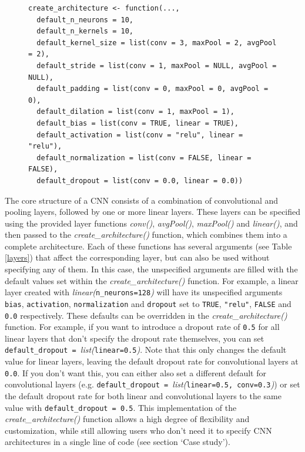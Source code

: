 \documentclass[12pt,twoside]{scrreport}
\newcommand{\pkg}[1]{`#1'}
\newcommand{\fn}[2][]{\textit{#2(}#1\textit{)}}
\newcommand{\val}[1]{\texttt{#1}}
\begin{document}
\begin{figure}[h]
	\centering
	\newsavebox{\lstbox} %
	\begin{lrbox}{\lstbox}
		\begin{lstlisting}
create_architecture <- function(...,
  default_n_neurons = 10,
  default_n_kernels = 10,
  default_kernel_size = list(conv = 3, maxPool = 2, avgPool = 2),
  default_stride = list(conv = 1, maxPool = NULL, avgPool = NULL),
  default_padding = list(conv = 0, maxPool = 0, avgPool = 0),
  default_dilation = list(conv = 1, maxPool = 1),
  default_bias = list(conv = TRUE, linear = TRUE),
  default_activation = list(conv = "relu", linear = "relu"),
  default_normalization = list(conv = FALSE, linear = FALSE),
  default_dropout = list(conv = 0.0, linear = 0.0))
		\end{lstlisting}
	\end{lrbox}
	\resizebox{\textwidth}{!}{\usebox{\lstbox}}
\end{figure}

The core structure of a CNN consists of a combination of convolutional and pooling layers, followed by one or more linear layers. These layers can be specified using the provided layer functions \fn{conv}, \fn{avgPool}, \fn{maxPool} and \fn{linear}, and then passed to the \fn{create\_architecture} function, which combines them into a complete architecture. Each of these functions has several arguments (see Table \ref{layers}) that affect the corresponding layer, but can also be used without specifying any of them. In this case, the unspecified arguments are filled with the default values set within the \fn{create\_architecture} function. For example, a linear layer created with \fn[\val{n\_neurons=128}]{linear} will have its unspecified arguments \val{bias}, \val{activation}, \val{normalization} and \val{dropout} set to \val{TRUE}, \val{"relu"}, \val{FALSE} and \val{0.0} respectively. These defaults can be overridden in the \fn{create\_architecture} function. For example, if you want to introduce a dropout rate of \val{0.5} for all linear layers that don't specify the dropout rate themselves, you can set \val{default\_dropout = }\fn[\val{linear=0.5}]{list}. Note that this only changes the default value for linear layers, leaving the default dropout rate for convolutional layers at \val{0.0}. If you don't want this, you can either also set a different default for convolutional layers (e.g. \val{default\_dropout = }\fn[\val{linear=0.5, conv=0.3}]{list}) or set the default dropout rate for both linear and convolutional layers to the same value with \val{default\_dropout = 0.5}. This implementation of the \fn{create\_architecture} function allows a high degree of flexibility and customization, while still allowing users who don't need it to specify CNN architectures in a single line of code (see section \pkg{Case study}).
\end{document}
